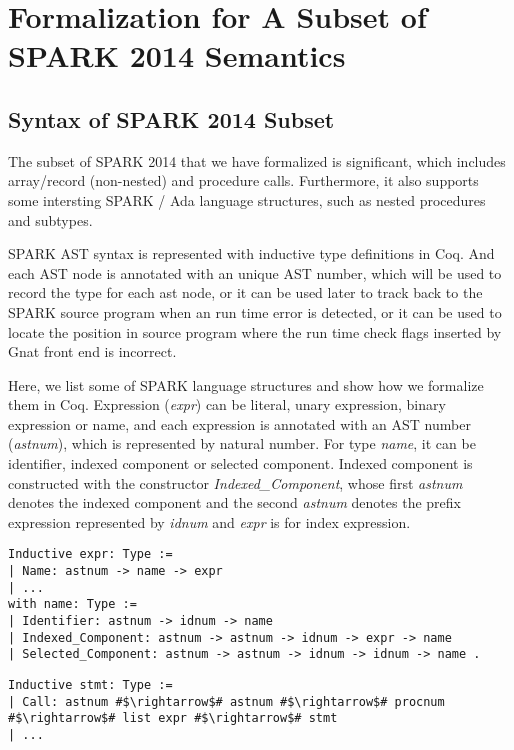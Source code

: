 \section{Formalization for A Subset of SPARK 2014 Semantics}
\subsection{Syntax of SPARK 2014 Subset}
The subset of SPARK 2014 that we have formalized is significant, which includes
array/record (non-nested) and procedure calls. Furthermore, it also supports
some intersting SPARK / Ada language structures, such as nested procedures and
subtypes.

SPARK AST syntax is represented with inductive type definitions in Coq. And each
AST node is annotated with an unique AST number, which will be used to record
the type for each ast node, or it can be used later to track back to the
SPARK source program when an run time error is detected, or it can be used to
locate the position in source program where the run time check flags inserted by
Gnat front end is incorrect.

Here, we list some of SPARK language structures and show how we formalize them
in Coq. Expression (\textit{expr}) can be literal, unary expression, binary
expression or name, and each expression is annotated with an AST number
(\textit{astnum}), which is represented by natural number. For type
\textit{name}, it can be identifier, indexed component or selected component.
Indexed component is constructed with the constructor
\textit{Indexed\_Component}, whose first \textit{astnum} denotes the indexed
component and the second \textit{astnum} denotes the prefix expression
represented by \textit{idnum} and \textit{expr} is for index expression. 



\begin{lstlisting}[escapechar=\#, language=coq, basicstyle=\small]
Inductive expr: Type := 
| Name: astnum -> name -> expr 
| ...
with name: Type := 
| Identifier: astnum -> idnum -> name 
| Indexed_Component: astnum -> astnum -> idnum -> expr -> name 
| Selected_Component: astnum -> astnum -> idnum -> idnum -> name .
\end{lstlisting}

\begin{lstlisting}[escapechar=\#, language=coq, basicstyle=\small]
Inductive stmt: Type := 
| Call: astnum #$\rightarrow$# astnum #$\rightarrow$# procnum #$\rightarrow$# list expr #$\rightarrow$# stmt 
| ...
\end{lstlisting}


